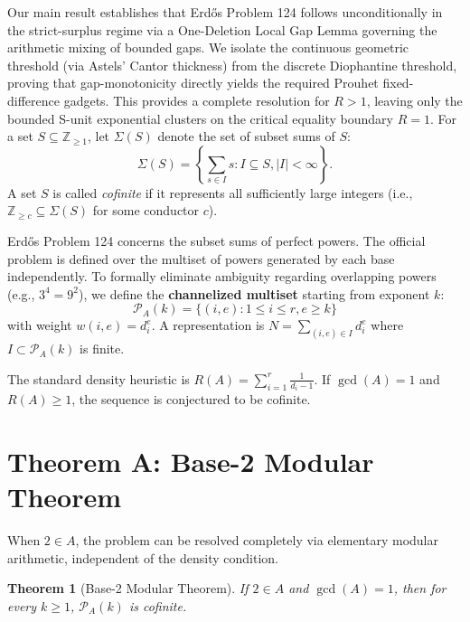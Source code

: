 \documentclass[12pt,reqno]{amsart}
\newtheorem{theorem}{Theorem}[section]
\theoremstyle{definition}
\newcommand{\Z}{\mathbb{Z}}
\begin{document}
Our main result establishes that Erd\H{o}s Problem 124 follows unconditionally in the strict-surplus regime via a One-Deletion Local Gap Lemma governing the arithmetic mixing of bounded gaps. We isolate the continuous geometric threshold (via Astels' Cantor thickness) from the discrete Diophantine threshold, proving that gap-monotonicity directly yields the required Prouhet fixed-difference gadgets. This provides a complete resolution for $R > 1$, leaving only the bounded S-unit exponential clusters on the critical equality boundary $R=1$.
For a set $S \subseteq \Z_{\ge 1}$, let $\Sigma(S)$ denote the set of subset sums of $S$:
\[
\Sigma(S) = \left\{ \sum_{s \in I} s : I \subseteq S, |I| < \infty \right\}.
\]
A set $S$ is called \emph{cofinite} if it represents all sufficiently large integers (i.e., $\Z_{\ge c} \subseteq \Sigma(S)$ for some conductor $c$).

Erd\H{o}s Problem 124 concerns the subset sums of perfect powers. The official problem is defined over the multiset of powers generated by each base independently. To formally eliminate ambiguity regarding overlapping powers (e.g., $3^4 = 9^2$), we define the \textbf{channelized multiset} starting from exponent $k$:
\[
\mathcal{P}_A(k) = \{(i, e) : 1 \le i \le r, e \ge k\}
\]
with weight $w(i, e) = d_i^e$. A representation is $N = \sum_{(i,e) \in I} d_i^e$ where $I \subset \mathcal{P}_A(k)$ is finite.

The standard density heuristic is $R(A) = \sum_{i=1}^r \frac{1}{d_i-1}$. If $\gcd(A) = 1$ and $R(A) \ge 1$, the sequence is conjectured to be cofinite.

\section{Theorem A: Base-2 Modular Theorem}

When $2 \in A$, the problem can be resolved completely via elementary modular arithmetic, independent of the density condition.

\begin{theorem}[Base-2 Modular Theorem]\label{thm:base2}
If $2 \in A$ and $\gcd(A) = 1$, then for every $k \ge 1$, $\mathcal{P}_A(k)$ is cofinite.
\end{theorem}
\end{document}
